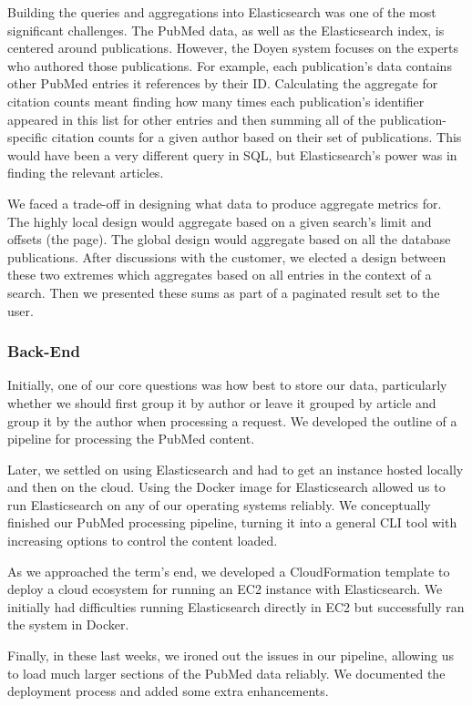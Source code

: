 Building the queries and aggregations into Elasticsearch was one of the most significant challenges. The PubMed data, as well as the Elasticsearch index, is centered around publications. However, the Doyen system focuses on the experts who authored those publications. For example, each publication's data contains other PubMed entries it references by their ID. Calculating the aggregate for citation counts meant finding how many times each publication's identifier appeared in this list for other entries and then summing all of the publication-specific citation counts for a given author based on their set of publications. This would have been a very different query in SQL, but Elasticsearch's power was in finding the relevant articles. 

We faced a trade-off in designing what data to produce aggregate metrics for. The highly local design would aggregate based on a given search's limit and offsets (the page). The global design would aggregate based on all the database publications. After discussions with the customer, we elected a design between these two extremes which aggregates based on all entries in the context of a search. Then we presented these sums as part of a paginated result set to the user. 

\subsubsection{Back-End}

Initially, one of our core questions was how best to store our data, particularly whether we should first group it by author or leave it grouped by article and group it by the author when processing a request. We developed the outline of a pipeline for processing the PubMed content. 

Later, we settled on using Elasticsearch and had to get an instance hosted locally and then on the cloud. Using the Docker image for Elasticsearch allowed us to run Elasticsearch on any of our operating systems reliably. We conceptually finished our PubMed processing pipeline, turning it into a general CLI tool with increasing options to control the content loaded. 

As we approached the term's end, we developed a CloudFormation template to deploy a cloud ecosystem for running an EC2 instance with Elasticsearch. We initially had difficulties running Elasticsearch directly in EC2 but successfully ran the system in Docker. 

Finally, in these last weeks, we ironed out the issues in our pipeline, allowing us to load much larger sections of the PubMed data reliably. We documented the deployment process and added some extra enhancements. 

